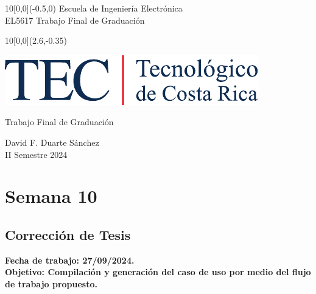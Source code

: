 \documentclass[12pt,letterpaper]{article}
\newcommand{\EstudianteA}{David F. Duarte Sánchez}
\begin{document}
	
\graphicspath{{./}{./fig/}}


%
\begin{textblock}{10}[0,0](-0.5,0)
	\large Escuela de Ingeniería Electrónica \\ 
	EL5617 Trabajo Final de Graduación \\
\end{textblock}

%
\begin{textblock}{10}[0,0](2.6,-0.35)
	\begin{flushright}
		\includegraphics[scale=0.8]{Firma_TEC-4.pdf}
	\end{flushright}
\end{textblock}

\begin{center}
	\vspace{70mm}
	{\large\color{tecRojo} Trabajo Final de Graduación}
	\par\vspace{8mm}
	{\Large\bf\color{tecAzul}{Bitácora de Trabajo - Entrega 6}}
	\par\vspace{100mm}
	{{\EstudianteA \\ II Semestre 2024} 
	\vspace{8mm}}
\end{center}

\newpage

\renewcommand{\baselinestretch}{1.1}    %


\section{Semana 10}
\subsection{Corrección de Tesis}

\bf{Fecha de trabajo:} 27/09/2024.\\
\bf{Objetivo:} Compilación y generación del caso de uso por medio del flujo de trabajo propuesto.
\end{document}
